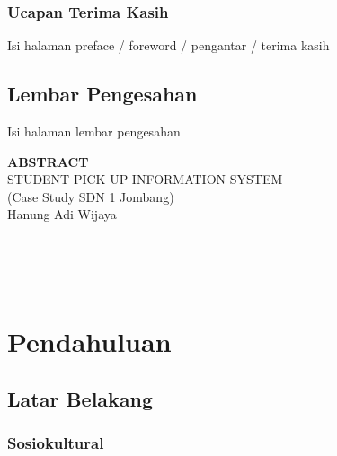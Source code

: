 \documentclass[a4paper, 12pt, oneside]{book}
\begin{document}
\subsection*{Ucapan Terima Kasih}
Isi halaman preface / foreword / pengantar / terima kasih

\newpage
\section*{Lembar Pengesahan}
Isi halaman lembar pengesahan

\tableofcontents
\listoffigures
\listoftables
\newpage
\begin{center}
\textbf{ABSTRACT}\\
STUDENT PICK UP INFORMATION SYSTEM\\
(Case Study SDN 1 Jombang)\\
Hanung Adi Wijaya\\
\vspace{1cm}
\end{center}
{\sf \lipsum[1]}\\
\lipsum[2]\\
\lipsum[3]\\

{}
\mainmatter
\chapter{Pendahuluan}
\section{Latar Belakang}

%
\subsection{Sosiokultural}
\textsl{\lipsum[1]}
\end{document}
